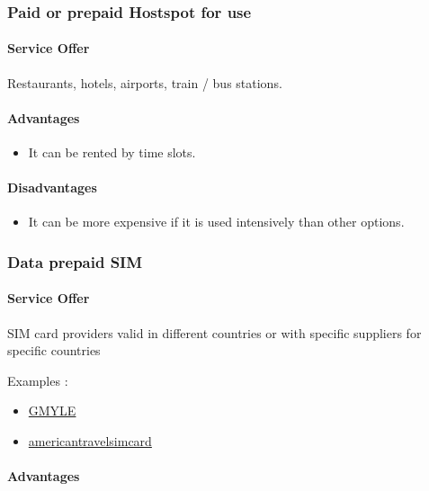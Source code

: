 \documentclass[12pt]{report}
\begin{document}
  \subsubsection{Paid or prepaid Hostspot for use} \label{ch:prepaid-router}

  \paragraph*{Service Offer}
  Restaurants, hotels, airports, train / bus stations.

  \paragraph*{Advantages}
  \begin{itemize}
    \item It can be rented by time slots.
  \end{itemize}

  \paragraph*{Disadvantages}
  \begin{itemize}
    \item It can be more expensive if it is used intensively than other options.
  \end{itemize}


  \subsubsection{Data prepaid SIM} \label{ch:prepaid-sim}
  \paragraph*{Service Offer}

  SIM card providers valid in different countries or with specific suppliers for specific countries

  Examples :
  \begin{itemize}
    \item \href{https://www.gmyle.com/}{GMYLE}
    \item \href{https://www.americantravelsimcard.com/}{americantravelsimcard}
  \end{itemize}

  \paragraph*{Advantages}
\end{document}
